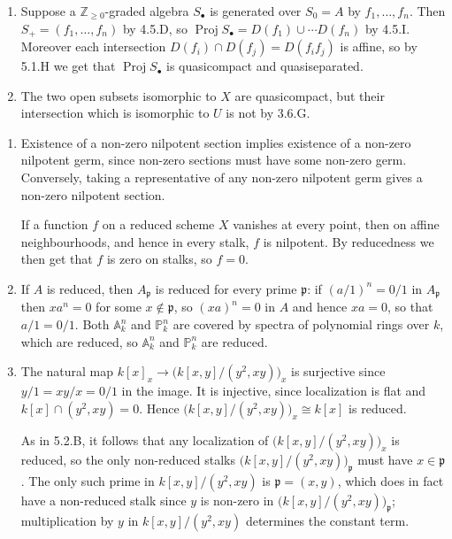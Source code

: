 \documentclass{report}
\newcommand{\p}{\mathfrak{p}}
\newcommand{\A}{\mathbb{A}}
\renewcommand{\P}{\mathbb{P}} %
\newcommand{\Z}{\mathbb{Z}}
\DeclareMathOperator{\Proj}{Proj}
\begin{document}
\begin{enumerate}[label=\textbf{5.1.\Alph*.}]
	\item Suppose a $\Z_{\ge0}$-graded algebra $S_\bullet$ is generated over
	      $S_0=A$ by $f_1,\ldots,f_n$. Then $S_+=(f_1,\ldots,f_n)$ by 4.5.D, so
	      $\Proj S_\bullet=D(f_1)\cup\cdots D(f_n)$ by 4.5.I. Moreover each
	      intersection $D(f_i)\cap D(f_j)=D(f_if_j)$ is affine, so by 5.1.H we
	      get that $\Proj S_\bullet$ is quasicompact and quasiseparated.

	\item The two open subsets isomorphic to $X$ are quasicompact, but their
	      intersection which is isomorphic to $U$ is not by 3.6.G.
\end{enumerate}

\begin{enumerate}[label=\textbf{5.2.\Alph*.}]
	\item Existence of a non-zero nilpotent section implies existence of a
	      non-zero nilpotent germ, since non-zero sections must have some non-zero
	      germ. Conversely, taking a representative of any non-zero nilpotent germ
	      gives a non-zero nilpotent section.

	      If a function $f$ on a reduced scheme $X$ vanishes at every point, then
	      on affine neighbourhoods, and hence in every stalk, $f$ is nilpotent. By
	      reducedness we then get that $f$ is zero on stalks, so $f=0$.

	\item If $A$ is reduced, then $A_\p$ is reduced for every prime $\p$: if
	      $(a/1)^n=0/1$ in $A_\p$ then $xa^n=0$ for some $x\notin\p$, so
	      $(xa)^n=0$ in $A$ and hence $xa=0$, so that $a/1=0/1$. Both $\A^n_k$ and
	      $\P^n_k$ are covered by spectra of polynomial rings over $k$, which are
	      reduced, so $\A^n_k$ and $\P^n_k$ are reduced.

	\item The natural map $k[x]_x\to\bigl(k[x,y]/(y^2,xy)\bigr)_x$ is surjective
	      since $y/1=xy/x=0/1$ in the image. It is injective, since
	      localization is flat and $k[x]\cap(y^2,xy)=0$. Hence
	      $\bigl(k[x,y]/(y^2,xy)\bigr)_x\cong k[x]$ is reduced.

	      As in 5.2.B, it follows that any localization of
	      $\bigl(k[x,y]/(y^2,xy)\bigr)_x$ is reduced, so the only non-reduced
	      stalks $\bigl(k[x,y]/(y^2,xy)\bigr)_\p$ must have $x\in\p$. The only
	      such prime in $k[x,y]/(y^2,xy)$ is $\p=(x,y)$, which does in fact have
	      a non-reduced stalk since $y$ is non-zero in
	      $\bigl(k[x,y]/(y^2,xy)\bigr)_\p$; multiplication by $y$ in
	      $k[x,y]/(y^2,xy)$ determines the constant term.


\end{enumerate}
\end{document}
